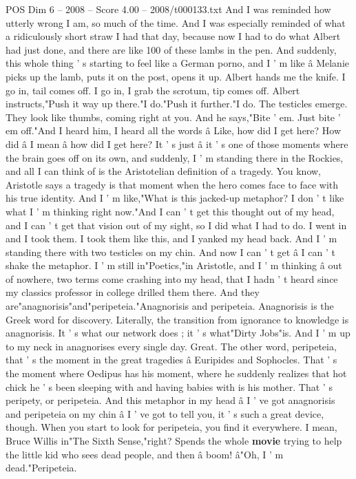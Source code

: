 \begin{textsample}{POS Dim 6 – 2008 – Score 4.00 – 2008/t000133.txt}
And I was reminded how utterly wrong I am, so much of the time.
And I was especially reminded of what a ridiculously short straw I had that day, because now I had to do what Albert had just done, and there are like 100 of these lambs in the pen.
And suddenly, this whole thing ' s starting to feel like a German porno, and I ' m like â Melanie picks up the lamb, puts it on the post, opens it up.
Albert hands me the knife.
I go in, tail comes off.
I go in, I grab the scrotum, tip comes off.
Albert instructs,"Push it way up there."I do."Push it further."I do.
The testicles emerge.
They look like thumbs, coming right at you.
And he says,"Bite ' em.
Just bite ' em off."And I heard him, I heard all the words â Like, how did I get here?
How did â I mean â how did I get here?
It ' s just â it ' s one of those moments where the brain goes off on its own, and suddenly, I ' m standing there in the Rockies, and all I can think of is the Aristotelian definition of a tragedy.
You know, Aristotle says a tragedy is that moment when the hero comes face to face with his true identity.
And I ' m like,"What is this jacked-up metaphor?
I don ' t like what I ' m thinking right now."And I can ' t get this thought out of my head, and I can ' t get that vision out of my sight, so I did what I had to do.
I went in and I took them.
I took them like this, and I yanked my head back.
And I ' m standing there with two testicles on my chin.
And now I can ' t get â I can ' t shake the metaphor.
I ' m still in"Poetics,"in Aristotle, and I ' m thinking â out of nowhere, two terms come crashing into my head, that I hadn ' t heard since my classics professor in college drilled them there.
And they are"anagnorisis"and"peripeteia."Anagnorisis and peripeteia.
Anagnorisis is the Greek word for discovery.
Literally, the transition from ignorance to knowledge is anagnorisis.
It ' s what our network does ; it ' s what"Dirty Jobs"is.
And I ' m up to my neck in anagnorises every single day.
Great.
The other word, peripeteia, that ' s the moment in the great tragedies â Euripides and Sophocles.
That ' s the moment where Oedipus has his moment, where he suddenly realizes that hot chick he ' s been sleeping with and having babies with is his mother.
That ' s peripety, or peripeteia.
And this metaphor in my head â I ' ve got anagnorisis and peripeteia on my chin â I ' ve got to tell you, it ' s such a great device, though.
When you start to look for peripeteia, you find it everywhere.
I mean, Bruce Willis in"The Sixth Sense,"right?
Spends the whole \textbf{movie} trying to help the little kid who sees dead people, and then â boom! â"Oh, I ' m dead."Peripeteia.

\end{textsample}
